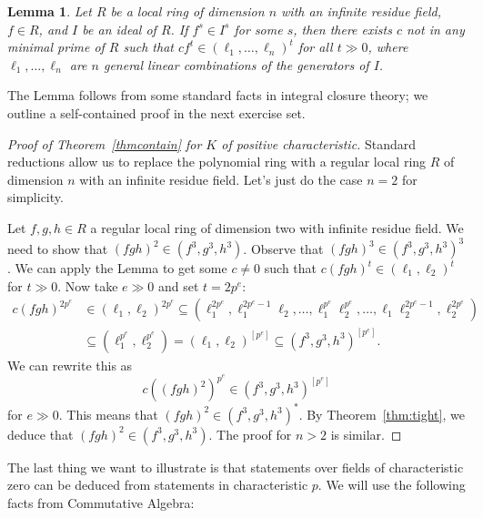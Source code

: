 \documentclass[12pt]{amsart}
\newtheorem{lemma}[theorem]{Lemma}
\theoremstyle{definition}
\numberwithin{equation}{theorem}
\def\frakp{\mathfrak{p}}
\begin{document}

\begin{lemma}\label{lem:IC} Let $R$ be a local ring of dimension $n$ with an infinite residue field, $f\in R$, and $I$ be an ideal of $R$. If $f^s\in I^s$ for some $s$, then there exists $c$ not in any minimal prime of $R$ such that $cf^t \in (\ell_1,\dots,\ell_n)^t$ for all $t\gg 0$, where $\ell_1,\dots,\ell_n$ are $n$ general linear combinations of the generators of $I$.
\end{lemma}

The Lemma follows from some standard facts in integral closure theory; we outline a self-contained proof in the next exercise set.

\begin{proof}[Proof of Theorem~\ref{thmcontain} for $K$ of positive characteristic]
Standard reductions allow us to replace the polynomial ring with a regular local ring $R$ of dimension $n$ with an infinite residue field. 
Let's just do the case $n=2$ for simplicity.

Let $f,g,h\in R$ a regular local ring of dimension two with infinite residue field. We need to show that $(fgh)^2\in (f^3,g^3,h^3)$. Observe that $(fgh)^3\in (f^3,g^3,h^3)^3$. We can apply the Lemma to get some $c\neq 0$ such that $c (fgh)^t\in (\ell_1,\ell_2)^t$ for $t\gg 0$. Now take $e\gg 0$ and set $t=2 p^e$:
\[\begin{aligned} c (fgh)^{2 p^e} &\in (\ell_1, \ell_2)^{2 p^e} \subseteq (\ell_1^{2 p^e} ,\ell_1^{2 p^e-1}\ell_2 ,\dots , \ell_1^{p^e} \ell_2^{p^e} , \dots, \ell_1 \ell_2^{2 p^e -1}, \ell_2^{2p^e}) \\
&\subseteq (\ell_1^{p^e},\ell_2^{p^e}) = (\ell_1,\ell_2)^{[p^e]} \subseteq (f^3,g^3,h^3)^{[p^e]}.\end{aligned}\]
We can rewrite this as
\[ c \left((fgh)^2\right)^{p^e} \in (f^3,g^3,h^3)^{[p^e]}\]
for $e\gg 0$. This means that $(fgh)^2 \in (f^3,g^3,h^3)^*$. By Theorem~\ref{thm:tight}, we deduce that ${(fgh)^2 \in(f^3,g^3,h^3)}$. The proof for $n>2$ is similar.
\end{proof}

The last thing we want to illustrate is that statements over fields of characteristic zero can be deduced from statements in characteristic $p$. We will use the following facts from Commutative Algebra:
\end{document}
